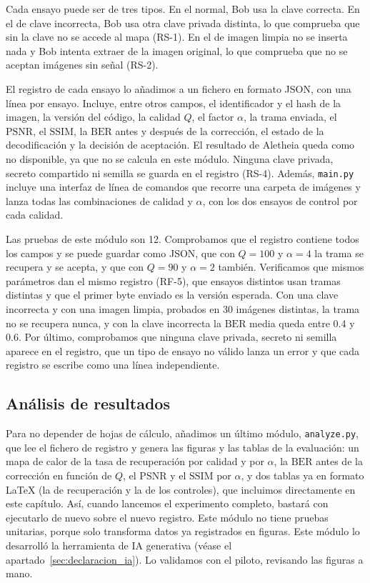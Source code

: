 \documentclass[IB]{TFUOC}%
\begin{document}
Cada ensayo puede ser de tres tipos. En el normal, Bob usa la clave correcta. En el de clave incorrecta, Bob 
usa otra clave privada distinta, lo que comprueba que sin la clave no se accede al 
mapa (RS-1). En el de imagen limpia no se inserta nada y Bob intenta extraer de la 
imagen original, lo que comprueba que no se aceptan imágenes sin señal (RS-2).

El registro de cada ensayo lo añadimos a un fichero en formato JSON, con una línea por 
ensayo. Incluye, entre otros campos, el identificador y el hash de la imagen, la versión 
del código, la calidad $Q$, el factor $\alpha$, la trama enviada, el $\mathrm{PSNR}$, el $\mathrm{SSIM}$, la $\mathrm{BER}$ antes y 
después de la corrección, el estado de la decodificación y la decisión de 
aceptación. El resultado de Aletheia queda como no disponible, ya que no se calcula en 
este módulo. Ninguna clave privada, secreto compartido ni semilla se guarda en el 
registro (RS-4). Además, \texttt{main.py} incluye una interfaz de línea de comandos que 
recorre una carpeta de imágenes y lanza todas las combinaciones de 
calidad y $\alpha$, con los dos ensayos de control por cada calidad.

Las pruebas de este módulo son 12. Comprobamos que el registro contiene todos los 
campos y se puede guardar como JSON, que con $Q=100$ y $\alpha=4$ la trama se 
recupera y se acepta, y que con $Q=90$ y $\alpha=2$ también. Verificamos que mismos parámetros 
dan el mismo registro (RF-5), que ensayos distintos usan tramas distintas y que el 
primer byte enviado es la versión esperada. Con una clave incorrecta y con una imagen limpia, 
probados en 30 imágenes distintas, la trama no se recupera nunca, y con la clave 
incorrecta la $\mathrm{BER}$ media queda entre 0{.}4 y 0{.}6. Por último, comprobamos
que ninguna clave privada, secreto ni semilla aparece en el registro, que un 
tipo de ensayo no válido lanza un error y que cada registro se escribe como una línea 
independiente.

\subsection{Análisis de resultados}
\label{subsec:impl_analyze}

Para no depender de hojas de cálculo, añadimos un último módulo, \texttt{analyze.py}, que lee el fichero de registro y genera las figuras y las tablas de la evaluación: un mapa de calor de la tasa de recuperación por calidad y por $\alpha$, la $\mathrm{BER}$ antes de la corrección en función de $Q$, el $\mathrm{PSNR}$ y el $\mathrm{SSIM}$ por $\alpha$, y dos tablas ya en formato \LaTeX{} (la de recuperación y la de los controles), que incluimos directamente en este capítulo. Así, cuando lancemos el experimento completo, bastará con ejecutarlo de nuevo sobre el nuevo registro. Este módulo no tiene pruebas unitarias, porque solo transforma datos ya registrados en figuras. Este módulo lo desarrolló la herramienta de IA generativa (véase el apartado~\ref{sec:declaracion_ia}). Lo validamos con el piloto, revisando las figuras a mano.
\end{document}
